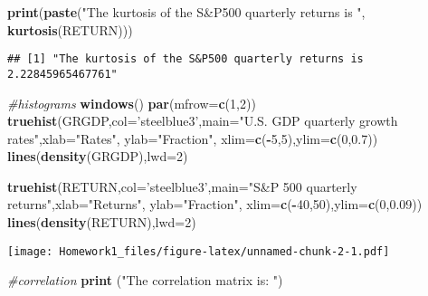 \documentclass[]{article}
\newenvironment{Shaded}{\begin{snugshade}}{\end{snugshade}}
\newcommand{\KeywordTok}[1]{\textcolor[rgb]{0.13,0.29,0.53}{\textbf{#1}}}
\newcommand{\DataTypeTok}[1]{\textcolor[rgb]{0.13,0.29,0.53}{#1}}
\newcommand{\DecValTok}[1]{\textcolor[rgb]{0.00,0.00,0.81}{#1}}
\newcommand{\FloatTok}[1]{\textcolor[rgb]{0.00,0.00,0.81}{#1}}
\newcommand{\StringTok}[1]{\textcolor[rgb]{0.31,0.60,0.02}{#1}}
\newcommand{\CommentTok}[1]{\textcolor[rgb]{0.56,0.35,0.01}{\textit{#1}}}
\newcommand{\OperatorTok}[1]{\textcolor[rgb]{0.81,0.36,0.00}{\textbf{#1}}}
\newcommand{\NormalTok}[1]{#1}
\begin{document}
\begin{Shaded}
\begin{Highlighting}[]
\KeywordTok{print}\NormalTok{(}\KeywordTok{paste}\NormalTok{(}\StringTok{"The kurtosis of the S&P500 quarterly returns is "}\NormalTok{, }\KeywordTok{kurtosis}\NormalTok{(RETURN)))}
\end{Highlighting}
\end{Shaded}

\begin{verbatim}
## [1] "The kurtosis of the S&P500 quarterly returns is  2.22845965467761"
\end{verbatim}

\begin{Shaded}
\begin{Highlighting}[]
\CommentTok{#histograms}
\KeywordTok{windows}\NormalTok{()}
\KeywordTok{par}\NormalTok{(}\DataTypeTok{mfrow=}\KeywordTok{c}\NormalTok{(}\DecValTok{1}\NormalTok{,}\DecValTok{2}\NormalTok{))}
\KeywordTok{truehist}\NormalTok{(GRGDP,}\DataTypeTok{col=}\StringTok{'steelblue3'}\NormalTok{,}\DataTypeTok{main=}\StringTok{"U.S. GDP quarterly growth rates"}\NormalTok{,}\DataTypeTok{xlab=}\StringTok{"Rates"}\NormalTok{, }\DataTypeTok{ylab=}\StringTok{"Fraction"}\NormalTok{,}
         \DataTypeTok{xlim=}\KeywordTok{c}\NormalTok{(}\OperatorTok{-}\DecValTok{5}\NormalTok{,}\DecValTok{5}\NormalTok{),}\DataTypeTok{ylim=}\KeywordTok{c}\NormalTok{(}\DecValTok{0}\NormalTok{,}\FloatTok{0.7}\NormalTok{))}
\KeywordTok{lines}\NormalTok{(}\KeywordTok{density}\NormalTok{(GRGDP),}\DataTypeTok{lwd=}\DecValTok{2}\NormalTok{)}

\KeywordTok{truehist}\NormalTok{(RETURN,}\DataTypeTok{col=}\StringTok{'steelblue3'}\NormalTok{,}\DataTypeTok{main=}\StringTok{"S&P 500 quarterly returns"}\NormalTok{,}\DataTypeTok{xlab=}\StringTok{"Returns"}\NormalTok{, }\DataTypeTok{ylab=}\StringTok{"Fraction"}\NormalTok{,}
         \DataTypeTok{xlim=}\KeywordTok{c}\NormalTok{(}\OperatorTok{-}\DecValTok{40}\NormalTok{,}\DecValTok{50}\NormalTok{),}\DataTypeTok{ylim=}\KeywordTok{c}\NormalTok{(}\DecValTok{0}\NormalTok{,}\FloatTok{0.09}\NormalTok{))}
\KeywordTok{lines}\NormalTok{(}\KeywordTok{density}\NormalTok{(RETURN),}\DataTypeTok{lwd=}\DecValTok{2}\NormalTok{)}
\end{Highlighting}
\end{Shaded}

\texttt{[image: Homework1\_files/figure-latex/unnamed-chunk-2-1.pdf]}

\begin{Shaded}
\begin{Highlighting}[]
\CommentTok{#correlation }
\KeywordTok{print}\NormalTok{ (}\StringTok{"The correlation matrix is: "}\NormalTok{)}
\end{Highlighting}
\end{Shaded}
\end{document}
